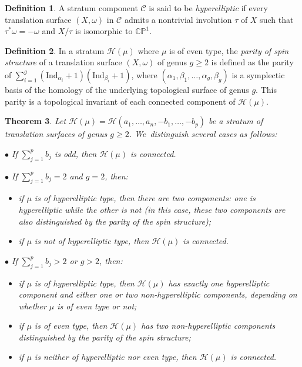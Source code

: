 \documentclass[11pt]{article}
\newcommand{\sbullet}{{\scriptscriptstyle\bullet}}
\newtheorem{thm}{Theorem}[section]
\theoremstyle{definition}
\newtheorem{defn}[thm]{Definition}
\begin{document}
\begin{defn}
A stratum component $\mathcal{C}$ is said to be \textit{hyperelliptic} if every translation surface $(X,\omega)$ in $\mathcal{C}$ admits a nontrivial involution $\tau$ of $X$ such that $\tau^{\ast} \omega = -\omega$ and $X / \tau$ is isomorphic to $\mathbb{CP}^{1}$.
\end{defn}

\begin{defn}
In a stratum $\mathcal{H}(\mu)$ where $\mu$ is of even type, the \textit{parity of spin structure} of a translation surface $(X,\omega)$ of genus $g \geq 2$ is defined as the parity of $\sum_{i=1}^{g} (\mathrm{Ind}_{\alpha_{i}}+1)(\mathrm{Ind}_{\beta_{i}}+1)$, where $(\alpha_{1},\beta_{1},\dots,\alpha_{g},\beta_{g})$ is a symplectic basis of the homology of the underlying topological surface of genus $g$. This parity is a topological invariant of each connected component of $\mathcal{H}(\mu)$.
\end{defn}

\begin{thm}\label{thm:BoissyHigherGenus}
Let $\mathcal{H}(\mu)=\mathcal{H}(a_{1},\dots,a_{n},-b_{1},\dots,-b_{p})$ be a stratum of translation surfaces of genus $g \geq 2$. We~distinguish several cases as follows:

$\sbullet$ If $\sum_{j=1}^p b_{j}$ is odd, then $\mathcal{H}(\mu)$ is connected.

$\sbullet$ If $\sum_{j=1}^p b_{j} =2$ and $g=2$, then:
\begin{itemize}
\item if $\mu$ is of hyperelliptic type, then
there are two components: one is hyperelliptic while the other is not (in this case, these two components are also distinguished by the parity of the spin structure);
\item if $\mu$ is not of hyperelliptic type, then $\mathcal{H}(\mu)$ is connected.
\end{itemize}

$\sbullet$ If $\sum_{j=1}^p b_{j} >2$ or $g>2$, then:
\begin{itemize}
\item if $\mu$ is of hyperelliptic type, then $\mathcal{H}(\mu)$ has exactly one hyperelliptic component and either one or two non-hyperelliptic components, depending on whether $\mu$ is of even type or not;
\item if $\mu$ is of even type, then $\mathcal{H}(\mu)$ has two non-hyperelliptic components distinguished by the parity of the spin structure;
\item if $\mu$ is neither of hyperelliptic nor even type, then $\mathcal{H}(\mu)$ is connected.
\end{itemize}
\end{thm}
\end{document}
